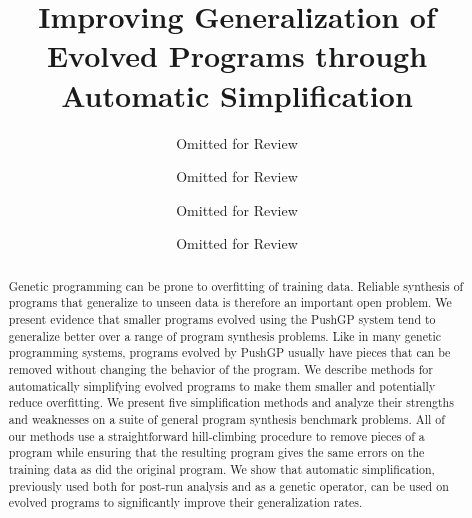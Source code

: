 \documentclass[sigconf]{acmart}
\begin{document}
\title{Improving Generalization of Evolved Programs through Automatic Simplification}

\author{Omitted for Review}

\author{Omitted for Review}

\author{Omitted for Review}

\author{Omitted for Review}

%
%
%



\begin{abstract}
Genetic programming can be prone to overfitting of training data. Reliable synthesis of programs that generalize to unseen data is therefore an important open problem. We present evidence that smaller programs evolved using the PushGP system tend to generalize better over a range of program synthesis problems. Like in many genetic programming systems, programs evolved by PushGP usually have pieces that can be removed without changing the behavior of the program. We describe methods for automatically simplifying evolved programs to make them smaller and potentially reduce overfitting. We present five simplification methods and analyze their strengths and weaknesses on a suite of general program synthesis benchmark problems. All of our methods use a straightforward hill-climbing procedure to remove pieces of a program while ensuring that the resulting program gives the same errors on the training data as did the original program. We show that automatic simplification, previously used both for post-run analysis and as a genetic operator, can be used on evolved programs to significantly improve their generalization rates.
\end{abstract}
\end{document}

